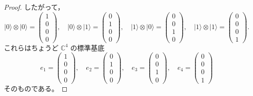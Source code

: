 \documentclass[dvipdfmx,a4paper]{jsarticle}
\theoremstyle{mystyle}
\begin{document}
\begin{proof}
\medskip
\noindent
したがって，
\[
|0\rangle\otimes|0\rangle=
\begin{pmatrix}
1\\0\\0\\0
\end{pmatrix},\quad
|0\rangle\otimes|1\rangle=
\begin{pmatrix}
0\\1\\0\\0
\end{pmatrix},\quad
|1\rangle\otimes|0\rangle=
\begin{pmatrix}
0\\0\\1\\0
\end{pmatrix},\quad
|1\rangle\otimes|1\rangle=
\begin{pmatrix}
0\\0\\0\\1
\end{pmatrix}.
\]
これらはちょうど $\mathbb{C}^4$ の標準基底
\[
e_1=
\begin{pmatrix}
1\\0\\0\\0
\end{pmatrix},\quad
e_2=
\begin{pmatrix}
0\\1\\0\\0
\end{pmatrix},\quad
e_3=
\begin{pmatrix}
0\\0\\1\\0
\end{pmatrix},\quad
e_4=
\begin{pmatrix}
0\\0\\0\\1
\end{pmatrix}
\]
そのものである。


\end{proof}
\end{document}
